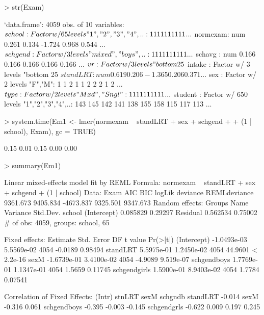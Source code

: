 \documentclass[12pt]{article}
\begin{document}
\begin{Schunk}
\begin{Sinput}
> str(Exam)
\end{Sinput}
\begin{Soutput}
`data.frame':	4059 obs. of  10 variables:
 $ school  : Factor w/ 65 levels "1","2","3","4",..: 1 1 1 1 1 1 1 1 1 1 ...
 $ normexam: num   0.261  0.134 -1.724  0.968  0.544 ...
 $ schgend : Factor w/ 3 levels "mixed","boys",..: 1 1 1 1 1 1 1 1 1 1 ...
 $ schavg  : num  0.166 0.166 0.166 0.166 0.166 ...
 $ vr      : Factor w/ 3 levels "bottom 25%","mid 50%",..: 2 2 2 2 2 2 2 2 2 2 ...
 $ intake  : Factor w/ 3 levels "bottom 25%","mid 50%",..: 1 2 3 2 2 1 3 2 2 3 ...
 $ standLRT: num   0.619  0.206 -1.365  0.206  0.371 ...
 $ sex     : Factor w/ 2 levels "F","M": 1 1 2 1 1 2 2 2 1 2 ...
 $ type    : Factor w/ 2 levels "Mxd","Sngl": 1 1 1 1 1 1 1 1 1 1 ...
 $ student : Factor w/ 650 levels "1","2","3","4",..: 143 145 142 141 138 155 158 115 117 113 ...
\end{Soutput}
\begin{Sinput}
> system.time(Em1 <- lmer(normexam ~ standLRT + sex + schgend + 
+     (1 | school), Exam), gc = TRUE)
\end{Sinput}
\begin{Soutput}
[1] 0.15 0.01 0.15 0.00 0.00
\end{Soutput}
\begin{Sinput}
> summary(Em1)
\end{Sinput}
\begin{Soutput}
Linear mixed-effects model fit by REML
Formula: normexam ~ standLRT + sex + schgend + (1 | school) 
   Data: Exam 
      AIC      BIC    logLik deviance REMLdeviance
 9361.673 9405.834 -4673.837 9325.501     9347.673
Random effects:
 Groups   Name        Variance Std.Dev.
 school   (Intercept) 0.085829 0.29297 
 Residual             0.562534 0.75002 
# of obs: 4059, groups: school, 65

Fixed effects:
                Estimate  Std. Error   DF t value  Pr(>|t|)
(Intercept)  -1.0493e-03  5.5569e-02 4054 -0.0189   0.98494
standLRT      5.5975e-01  1.2450e-02 4054 44.9601 < 2.2e-16
sexM         -1.6739e-01  3.4100e-02 4054 -4.9089 9.519e-07
schgendboys   1.7769e-01  1.1347e-01 4054  1.5659   0.11745
schgendgirls  1.5900e-01  8.9403e-02 4054  1.7784   0.07541

Correlation of Fixed Effects:
            (Intr) stnLRT sexM   schgndb
standLRT    -0.014                      
sexM        -0.316  0.061               
schgendboys -0.395 -0.003 -0.145        
schgendgrls -0.622  0.009  0.197  0.245 
\end{Soutput}
\end{Schunk}
\end{document}
